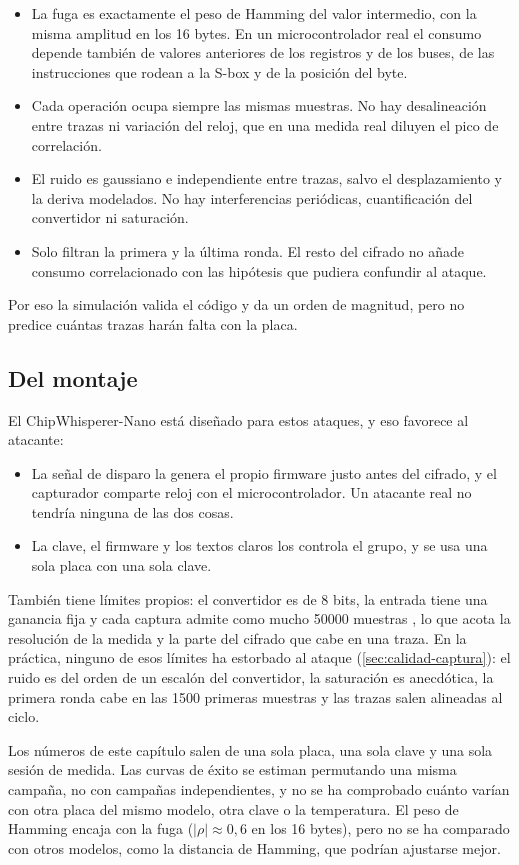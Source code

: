 \begin{itemize}
  \item La fuga es exactamente el peso de Hamming del valor intermedio, con la
    misma amplitud en los 16 bytes. En un microcontrolador real el consumo
    depende también de valores anteriores de los registros y de los buses, de
    las instrucciones que rodean a la S-box y de la posición del byte.
  \item Cada operación ocupa siempre las mismas muestras. No hay desalineación
    entre trazas ni variación del reloj, que en una medida real diluyen el
    pico de correlación.
  \item El ruido es gaussiano e independiente entre trazas, salvo el
    desplazamiento y la deriva modelados. No hay interferencias periódicas,
    cuantificación del convertidor ni saturación.
  \item Solo filtran la primera y la última ronda. El resto del cifrado no
    añade consumo correlacionado con las hipótesis que pudiera confundir al
    ataque.
\end{itemize}

Por eso la simulación valida el código y da un orden de magnitud, pero no
predice cuántas trazas harán falta con la placa.

\subsection{Del montaje}

El ChipWhisperer-Nano está diseñado para estos ataques, y eso favorece al
atacante:

\begin{itemize}
  \item La señal de disparo la genera el propio firmware justo antes del
    cifrado, y el capturador comparte reloj con el microcontrolador. Un
    atacante real no tendría ninguna de las dos cosas.
  \item La clave, el firmware y los textos claros los controla el grupo, y
    se usa una sola placa con una sola clave.
\end{itemize}

También tiene límites propios: el convertidor es de 8 bits, la entrada tiene
una ganancia fija y cada captura admite como mucho \num{50000} muestras
\cite{cw-nano-docs}, lo que acota la resolución de la medida y la parte del
cifrado que cabe en una traza. En la práctica, ninguno de esos límites ha
estorbado al ataque (\cref{sec:calidad-captura}): el ruido es del orden de un
escalón del convertidor, la saturación es anecdótica, la primera ronda cabe en
las \num{1500} primeras muestras y las trazas salen alineadas al ciclo.

Los números de este capítulo salen de una sola placa, una sola clave y una
sola sesión de medida. Las curvas de éxito se estiman permutando una misma
campaña, no con campañas independientes, y no se ha comprobado cuánto varían
con otra placa del mismo modelo, otra clave o la temperatura. El peso de
Hamming encaja con la fuga ($|\rho| \approx 0{,}6$ en los 16 bytes), pero no
se ha comparado con otros modelos, como la distancia de Hamming, que podrían
ajustarse mejor.
